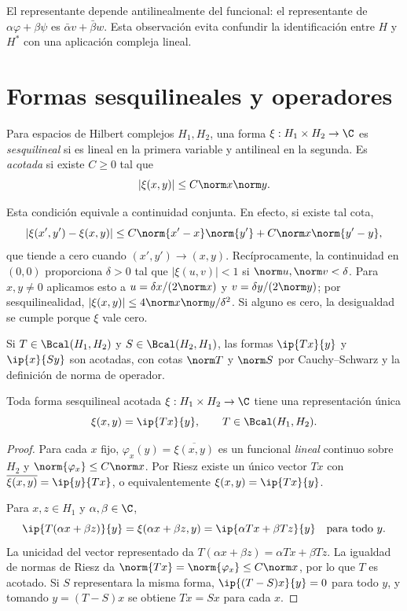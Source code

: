 El representante depende antilinealmente del funcional: el representante de $\alpha\varphi+\beta\psi$ es $\bar\alpha v+\bar\beta w$. Esta observación evita confundir la identificación entre $H$ y $H^*$ con una aplicación compleja lineal.

\section{Formas sesquilineales y operadores}
\begin{definicion}
Para espacios de Hilbert complejos $H_1,H_2$, una forma $\xi:H_1\times H_2\to\C$ es \emph{sesquilineal} si es lineal en la primera variable y antilineal en la segunda. Es \emph{acotada} si existe $C\geq0$ tal que
\[
 |\xi(x,y)|\leq C\norm x\norm y.
\]
\end{definicion}
Esta condición equivale a continuidad conjunta. En efecto, si existe tal cota,
\[
 |\xi(x',y')-\xi(x,y)|
 \leq C\norm{x'-x}\norm{y'}+C\norm x\norm{y'-y},
\]
que tiende a cero cuando $(x',y')\to(x,y)$. Recíprocamente, la continuidad en $(0,0)$ proporciona $\delta>0$ tal que $|\xi(u,v)|<1$ si $\norm u,\norm v<\delta$. Para $x,y\ne0$ aplicamos esto a $u=\delta x/(2\norm x)$ y $v=\delta y/(2\norm y)$; por sesquilinealidad,
$|\xi(x,y)|\leq4\norm x\norm y/\delta^2$. Si alguno es cero, la desigualdad se cumple porque $\xi$ vale cero.

Si $T\in\Bcal(H_1,H_2)$ y $S\in\Bcal(H_2,H_1)$, las formas $\ip{Tx}{y}$ y $\ip{x}{Sy}$ son acotadas, con cotas $\norm T$ y $\norm S$ por Cauchy--Schwarz y la definición de norma de operador.

\begin{teorema}\label{ch32:formas}
Toda forma sesquilineal acotada $\xi:H_1\times H_2\to\C$ tiene una representación única
\[
 \xi(x,y)=\ip{Tx}{y},\qquad T\in\Bcal(H_1,H_2).
\]
\end{teorema}
\begin{proof}
Para cada $x$ fijo, $\varphi_x(y)=\overline{\xi(x,y)}$ es un funcional \emph{lineal} continuo sobre $H_2$ y $\norm{\varphi_x}\leq C\norm x$. Por Riesz existe un único vector $Tx$ con $\overline{\xi(x,y)}=\ip{y}{Tx}$, o equivalentemente $\xi(x,y)=\ip{Tx}{y}$.

Para $x,z\in H_1$ y $\alpha,\beta\in\C$,
\[
 \ip{T(\alpha x+\beta z)}{y}=\xi(\alpha x+\beta z,y)
 =\ip{\alpha Tx+\beta Tz}{y}\quad\text{para todo }y.
\]
La unicidad del vector representado da $T(\alpha x+\beta z)=\alpha Tx+\beta Tz$. La igualdad de normas de Riesz da $\norm{Tx}=\norm{\varphi_x}\leq C\norm x$, por lo que $T$ es acotado. Si $S$ representara la misma forma, $\ip{(T-S)x}{y}=0$ para todo $y$, y tomando $y=(T-S)x$ se obtiene $Tx=Sx$ para cada $x$.
\end{proof}

